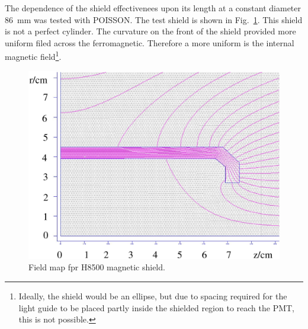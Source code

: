 \documentclass[12pt]{article}
\begin{document}
The dependence of 
the shield effectivenees upon its length at a constant diameter 
 86~mm was tested with POISSON. The  test  shield is 
shown in Fig.~\ref{Upstream_PMT_Design}. This  shield is not a 
perfect cylinder. The curvature on the front
 of the shield provided more uniform filed across the ferromagnetic.
 Therefore  a more uniform is the  internal magnetic field\footnote{Ideally, the shield would
 be an ellipse, but due to spacing required for the light guide to
 be placed partly inside the shielded region to reach the PMT, 
this is not possible.}.
%
\begin{figure}[htbp]
\centering
\includegraphics[width=1\textwidth]{H8500_Upstream_NETIC_6mmThick_69mmLength.eps}
\caption{\small{Field map fpr H8500 magnetic shield.}}
\label{Upstream_PMT_Design}
\end{figure}
%
\newpage
\clearpage
\end{document}
